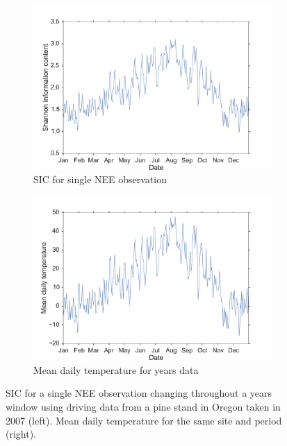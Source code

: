 \documentclass[11pt]{article}
\begin{document}
\begin{figure}[ht]
    \centering
    \begin{subfigure}[b]{0.45\textwidth}
        \includegraphics[width=\textwidth]{oregon2007SICnee.pdf}
        \caption{SIC for single NEE observation}
        \label{fig:sic_nee_oregon2007}
    \end{subfigure}%
    \begin{subfigure}[b]{0.45\textwidth}
        \includegraphics[width=\textwidth]{oregon2007temp.pdf}
        \caption{Mean daily temperature for years data}
        \label{fig:temp_nee_oregon2007}
    \end{subfigure}
    \caption{SIC for a single NEE observation changing throughout a years window using driving data from a pine stand in Oregon taken in 2007 (left). Mean daily temperature for the same site and period (right).}
    \label{fig:neeSIC_temp_comp}
\end{figure}
\end{document}
